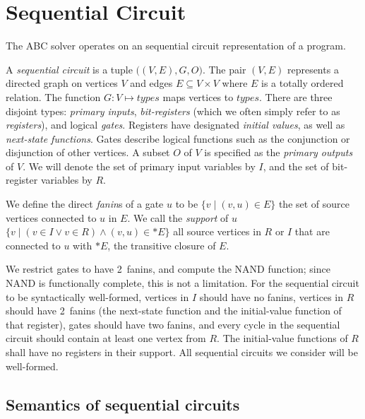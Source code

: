 \section{Sequential Circuit}
\label{sec:preliminaries}
The ABC solver operates on an sequential circuit representation of a program.
\begin{definition}
\rm A {\em sequential circuit} is a tuple $\big( (V, E),G,
O\big)$.  The pair $(V,E)$ represents a directed graph on
vertices $V$ and edges $E \subseteq V\times V$ where $E$
is a totally ordered relation.  The function $G: V \mapsto
{\mathit types}$ maps vertices to ${\mathit types}$.
There are three disjoint types: {\em primary inputs}, {\em
bit-registers} (which we often simply refer to as {\em
registers}), and logical {\em gates}.  Registers have designated
{\em initial values}, as well as {\em next-state
functions}.  Gates describe logical functions such as
the conjunction or disjunction of other vertices. 
A subset $O$ of $V$ is specified as the {\em
primary outputs} of $V$.  
We will denote the set of primary input variables by $I$,
and the set of bit-register variables by $R$.  
\label{def:back:seq_circuit}
\end{definition}

\begin{definition}[Fanins]
\rm We define the direct {\em fanin}s of a gate $u$ to be
$\{v \mid (v,u)\in E\}$ the set of source vertices connected
to $u$ in $E$.  We call the {\em support} of $u$ $\{v \mid
(v\in I \vee v \in R) \wedge (v,u) \in \ast E\}$ all
source vertices in $R$ or $I$ that are connected to $u$
with $\ast E$, the transitive closure of $E$.
\label{def:back:fanins} 
\end{definition}

We restrict gates to have 2~fanins, and
compute the NAND function; since NAND is functionally
complete, this is not a limitation.  For the sequential
circuit to be syntactically well-formed, vertices in $I$
should have no fanins, vertices in $R$ should have
2~fanins (the next-state function and the initial-value
function of that register), gates should have two fanins,
and every cycle in the sequential circuit should contain
at least one vertex from $R$.  The initial-value functions
of $R$ shall have no registers in their support.  All
sequential circuits we consider will be well-formed.  

\subsection{Semantics of sequential circuits}
\label{s:back:crct_semantics}

